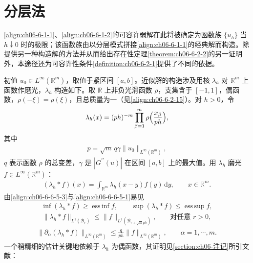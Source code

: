 \documentclass[../../main.tex]{subfiles}
\begin{document}
\section{分层法}\label{section:ch06-分层法}

\eqref{align:ch06-6-1-1}、\eqref{align:ch06-6-1-2}的可容许弱解在此将被确定为函数族 $\{u_{h}\}$ 当 $h\downarrow 0$ 时的极限；该函数族由以分层模式拼接\eqref{align:ch06-6-1-1}的经典解而构造。除提供另一种构造解的方法并从而给出存在性定理\cref{theorem:ch06-6-2-2}的另一证明外，本途径还为可容许性条件\cref{definition:ch06-6-2-1}提供了不同的依据。

初值 $u_{0}\in L^{\infty}(\mathbb{R}^{m})$，取值于紧区间 $[a,b]$。近似解的构造涉及用核 $\lambda_{h}$ 对 $\mathbb{R}^{m}$ 上函数作磨光，$\lambda_{h}$ 构造如下。取 $\mathbb{R}$ 上非负光滑函数 $\rho$，支集含于 $[-1,1]$，偶函数，$\rho(-\xi)=\rho(\xi)$，且总质量为一（见\eqref{align:ch06-6-2-15}）。对 $h>0$，令
\begin{align}
\lambda_{h}(x)=(ph)^{-m}\prod_{\beta=1}^{m}\rho\Bigl{(}\frac{x_{\beta}}{ph}\Bigr{)},
\label{align:ch06-6-6-5-1}
\end{align}
其中
\begin{align}
p=\sqrt{m}\,q\gamma\|u_{0}\|_{L^{\infty}(\mathbb{R}^{m})},
\label{align:ch06-6-6-5-2}
\end{align}
$q$ 表示函数 $\rho$ 的总变差，$\gamma$ 是 $|G^{\prime\prime}(u)|$ 在区间 $[a,b]$ 上的最大值。用 $\lambda_{h}$ 磨光 $f\in L^{\infty}(\mathbb{R}^{m})$：
\begin{align}
(\lambda_{h}*f)(x)=\int_{\mathbb{R}^{m}}\lambda_{h}(x-y)f(y)\,\mathrm{d}y,\qquad x\in\mathbb{R}^{m}.
\label{align:ch06-6-6-5-3}
\end{align}
由\eqref{align:ch06-6-6-5-3}与\eqref{align:ch06-6-6-5-1}易见
\begin{align}
\inf(\lambda_{h}*f)\geqslant\operatorname*{ess\,inf}f,\qquad
\sup(\lambda_{h}*f)\leqslant\operatorname*{ess\,sup}f,
\label{align:ch06-6-6-5-4}
\end{align}
\begin{align}
\|\lambda_{h}*f\|_{L^{1}(\mathscr{B}_{r})}\leqslant\|f\|_{L^{1}(\mathscr{B}_{r+\sqrt{m}ph})},\qquad\text{对任意 }r>0,
\label{align:ch06-6-6-5-5}
\end{align}
\begin{align}
\|\partial_{\alpha}(\lambda_{h}*f)\|_{L^{\infty}(\mathbb{R}^{m})}\leqslant\frac{q}{ph}\|f\|_{L^{\infty}(\mathbb{R}^{m})},\qquad \alpha=1,\cdots,m.
\label{align:ch06-6-6-5-6}
\end{align}
一个稍精细的估计关键地依赖于 $\lambda_{h}$ 为偶函数，其证明见\cref{section:ch06-注记}所引文献：
\end{document}
